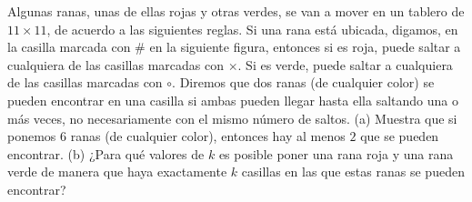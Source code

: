 Algunas ranas, unas de ellas rojas y otras verdes, se van a mover en un tablero de $11 \times 11$,
de acuerdo a las siguientes reglas. Si una rana está ubicada, digamos, en la casilla marcada
con $\#$ en la siguiente figura, entonces si es roja, puede saltar a cualquiera de las casillas marcadas con $\times$. Si es verde, puede saltar a cualquiera de las casillas marcadas con $\circ$.
Diremos que dos ranas (de cualquier color) se pueden encontrar en una casilla si ambas
pueden llegar hasta ella saltando una o más veces, no necesariamente con el mismo número
de saltos.
(a) Muestra que si ponemos $6$ ranas (de cualquier color), entonces hay al menos $2$ que se
pueden encontrar.
(b) ¿Para qué valores de $k$ es posible poner una rana roja y una rana verde de manera
que haya exactamente $k$ casillas en las que estas ranas se pueden encontrar?